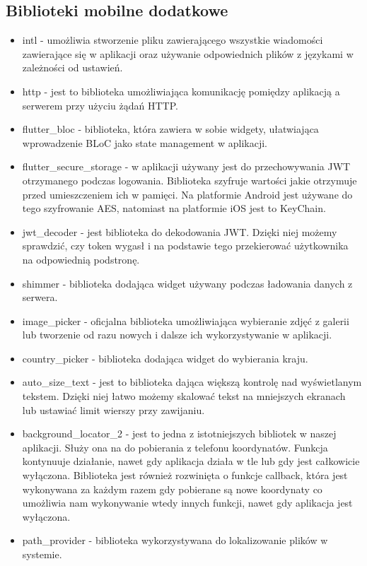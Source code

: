 \documentclass[a4paper,twoside,12pt]{book}
\begin{document}
\subsection{Biblioteki mobilne dodatkowe}
\begin{itemize}
    \item intl - umożliwia stworzenie pliku zawierającego wszystkie wiadomości zawierające się w aplikacji oraz używanie odpowiednich plików z językami w zależności od ustawień.
    \item http - jest to biblioteka umożliwiająca komunikację pomiędzy aplikacją a serwerem przy użyciu żądań HTTP.
    \item flutter\_bloc - biblioteka, która zawiera w sobie widgety, ułatwiająca wprowadzenie BLoC jako state management w aplikacji.
    \item flutter\_secure\_storage - w aplikacji używany jest do przechowywania JWT otrzymanego podczas logowania. Biblioteka szyfruje wartości jakie otrzymuje przed umieszczeniem ich w pamięci. Na platformie Android jest używane do tego szyfrowanie AES, natomiast na platformie iOS jest to KeyChain. 
    \item jwt\_decoder - jest biblioteka do dekodowania JWT. Dzięki niej możemy sprawdzić, czy token wygasł i na podstawie tego przekierować użytkownika na odpowiednią podstronę.
    \item shimmer - biblioteka dodająca widget używany podczas ładowania danych z serwera.
    \item image\_picker - oficjalna biblioteka umożliwiająca wybieranie zdjęć z galerii lub tworzenie od razu nowych i dalsze ich wykorzystywanie w aplikacji.
    \item country\_picker - biblioteka dodająca widget do wybierania kraju.
    \item auto\_size\_text - jest to biblioteka dająca większą kontrolę nad wyświetlanym tekstem. Dzięki niej łatwo możemy skalować tekst na mniejszych ekranach lub ustawiać limit wierszy przy zawijaniu.
    \item background\_locator\_2 - jest to jedna z istotniejszych bibliotek w naszej aplikacji. Służy ona na do pobierania z telefonu koordynatów. Funkcja kontynuuje działanie, nawet gdy aplikacja działa w tle lub gdy jest całkowicie wyłączona. Biblioteka jest również rozwinięta o funkcje callback, która jest wykonywana za każdym razem gdy pobierane są nowe koordynaty co umożliwia nam wykonywanie wtedy innych funkcji, nawet gdy aplikacja jest wyłączona.
    \item path\_provider - biblioteka wykorzystywana do lokalizowanie plików w systemie.

\end{itemize}
\end{document}
